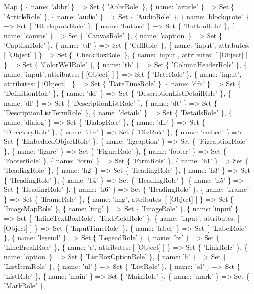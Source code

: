 \begin{DoxyCode}
Map \{
  \{ name: 'abbr' \} => Set \{ 'AbbrRole' \},
  \{ name: 'article' \} => Set \{ 'ArticleRole' \},
  \{ name: 'audio' \} => Set \{ 'AudioRole' \},
  \{ name: 'blockquote' \} => Set \{ 'BlockquoteRole' \},
  \{ name: 'button' \} => Set \{ 'ButtonRole' \},
  \{ name: 'canvas' \} => Set \{ 'CanvasRole' \},
  \{ name: 'caption' \} => Set \{ 'CaptionRole' \},
  \{ name: 'td' \} => Set \{ 'CellRole' \},
  \{ name: 'input', attributes: [ [Object] ] \} => Set \{ 'CheckBoxRole' \},
  \{ name: 'input', attributes: [ [Object] ] \} => Set \{ 'ColorWellRole' \},
  \{ name: 'th' \} => Set \{ 'ColumnHeaderRole' \},
  \{ name: 'input', attributes: [ [Object] ] \} => Set \{ 'DateRole' \},
  \{ name: 'input', attributes: [ [Object] ] \} => Set \{ 'DateTimeRole' \},
  \{ name: 'dfn' \} => Set \{ 'DefinitionRole' \},
  \{ name: 'dd' \} => Set \{ 'DescriptionListDetailRole' \},
  \{ name: 'dl' \} => Set \{ 'DescriptionListRole' \},
  \{ name: 'dt' \} => Set \{ 'DescriptionListTermRole' \},
  \{ name: 'details' \} => Set \{ 'DetailsRole' \},
  \{ name: 'dialog' \} => Set \{ 'DialogRole' \},
  \{ name: 'dir' \} => Set \{ 'DirectoryRole' \},
  \{ name: 'div' \} => Set \{ 'DivRole' \},
  \{ name: 'embed' \} => Set \{ 'EmbeddedObjectRole' \},
  \{ name: 'figcaption' \} => Set \{ 'FigcaptionRole' \},
  \{ name: 'figure' \} => Set \{ 'FigureRole' \},
  \{ name: 'footer' \} => Set \{ 'FooterRole' \},
  \{ name: 'form' \} => Set \{ 'FormRole' \},
  \{ name: 'h1' \} => Set \{ 'HeadingRole' \},
  \{ name: 'h2' \} => Set \{ 'HeadingRole' \},
  \{ name: 'h3' \} => Set \{ 'HeadingRole' \},
  \{ name: 'h4' \} => Set \{ 'HeadingRole' \},
  \{ name: 'h5' \} => Set \{ 'HeadingRole' \},
  \{ name: 'h6' \} => Set \{ 'HeadingRole' \},
  \{ name: 'iframe' \} => Set \{ 'IframeRole' \},
  \{ name: 'img', attributes: [ [Object] ] \} => Set \{ 'ImageMapRole' \},
  \{ name: 'img' \} => Set \{ 'ImageRole' \},
  \{ name: 'input' \} => Set \{ 'InlineTextBoxRole', 'TextFieldRole' \},
  \{ name: 'input', attributes: [ [Object] ] \} => Set \{ 'InputTimeRole' \},
  \{ name: 'label' \} => Set \{ 'LabelRole' \},
  \{ name: 'legend' \} => Set \{ 'LegendRole' \},
  \{ name: 'br' \} => Set \{ 'LineBreakRole' \},
  \{ name: 'a', attributes: [ [Object] ] \} => Set \{ 'LinkRole' \},
  \{ name: 'option' \} => Set \{ 'ListBoxOptionRole' \},
  \{ name: 'li' \} => Set \{ 'ListItemRole' \},
  \{ name: 'ul' \} => Set \{ 'ListRole' \},
  \{ name: 'ol' \} => Set \{ 'ListRole' \},
  \{ name: 'main' \} => Set \{ 'MainRole' \},
  \{ name: 'mark' \} => Set \{ 'MarkRole' \},

\end{DoxyCode}
